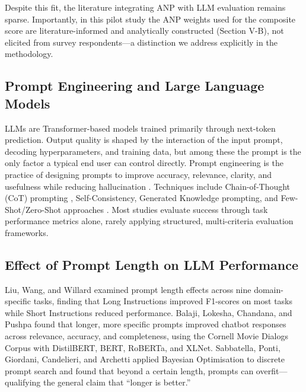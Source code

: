 \documentclass[conference]{IEEEtran}
\begin{document}
Despite this fit, the literature integrating ANP with LLM evaluation remains sparse. Importantly, in this pilot study the ANP weights used for the composite score are literature-informed and analytically constructed (Section V-B), not elicited from survey respondents---a distinction we address explicitly in the methodology.

\subsection{Prompt Engineering and Large Language Models}
LLMs are Transformer-based models trained primarily through next-token prediction. Output quality is shaped by the interaction of the input prompt, decoding hyperparameters, and training data, but among these the prompt is the only factor a typical end user can control directly. Prompt engineering is the practice of designing prompts to improve accuracy, relevance, clarity, and usefulness while reducing hallucination \cite{sahoo2024}. Techniques include Chain-of-Thought (CoT) prompting \cite{wei2022}, Self-Consistency, Generated Knowledge prompting, and Few-Shot/Zero-Shot approaches \cite{kojima2022}. Most studies evaluate success through task performance metrics alone, rarely applying structured, multi-criteria evaluation frameworks.

\subsection{Effect of Prompt Length on LLM Performance}
Liu, Wang, and Willard \cite{liu2025} examined prompt length effects across nine domain-specific tasks, finding that Long Instructions improved F1-scores on most tasks while Short Instructions reduced performance. Balaji, Lokesha, Chandana, and Pushpa \cite{balaji2024} found that longer, more specific prompts improved chatbot responses across relevance, accuracy, and completeness, using the Cornell Movie Dialogs Corpus with DistilBERT, BERT, RoBERTa, and XLNet. Sabbatella, Ponti, Giordani, Candelieri, and Archetti \cite{sabbatella2024} applied Bayesian Optimisation to discrete prompt search and found that beyond a certain length, prompts can overfit---qualifying the general claim that ``longer is better.''
\end{document}
